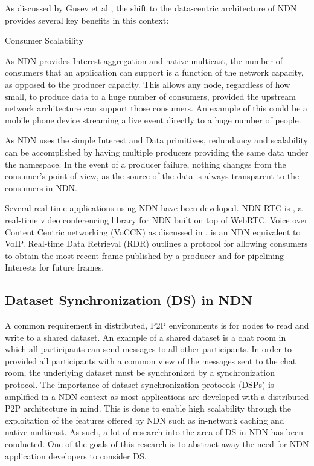 As discussed by Gusev et al \cite{realtime-streaming-data}, the shift to the data-centric architecture of NDN provides several key benefits in this context:

\begin{labeling}{Consumer Scalability }
    \item [Consumer Scalability] As NDN provides Interest aggregation and native multicast, the number of consumers that an application can support is a function of the network capacity, as opposed to the producer capacity. This allows any node, regardless of how small, to produce data to a huge number of consumers, provided the upstream network architecture can support those consumers. An example of this could be a mobile phone device streaming a live event directly to a huge number of people.
    \item [Producer Scalability] As NDN uses the simple Interest and Data primitives, redundancy and scalability can be accomplished by having multiple producers providing the same data under the namespace. In the event of a producer failure, nothing changes from the consumer's point of view, as the source of the data is always transparent to the consumers in NDN.
\end{labeling}

Several real-time applications using NDN have been developed. NDN-RTC is \cite{ndn-rtc}, a real-time video conferencing library for NDN built on top of WebRTC. Voice over Content Centric networking (VoCCN) \cite{vj-voccn} as discussed in , is an NDN equivalent to VoIP. Real-time Data Retrieval (RDR) \cite{realtime-data-retrieval} outlines a protocol for allowing consumers to obtain the most recent frame published by a producer and for pipelining Interests for future frames.


\subsection{Dataset Synchronization (DS) in NDN}\label{sec:dataset-sync}
A common requirement in distributed, P2P environments is for nodes to read and write to a shared dataset. An example of a shared dataset is a chat room in which all participants can send messages to all other participants. In order to provided all participants with a common view of the messages sent to the chat room, the underlying dataset must be synchronized by a synchronization protocol. The importance of dataset synchronization protocols (DSPs) is amplified in a NDN context as most applications are developed with a distributed P2P architecture in mind. This is done to enable high scalability through the exploitation of the features offered by NDN such as in-network caching and native multicast. As such, a lot of research into the area of DS in NDN has been conducted. One of the goals of this research is to abstract away the need for NDN application developers to consider DS.

